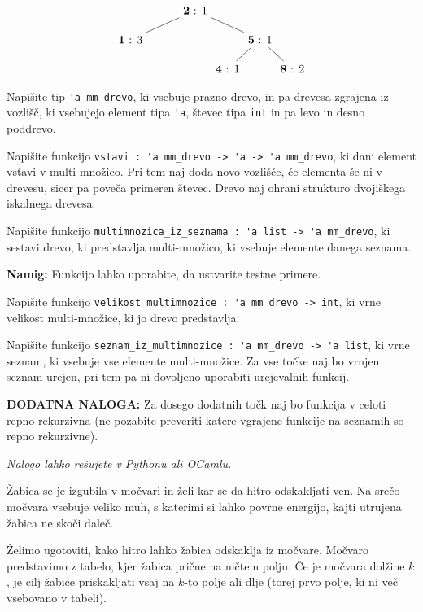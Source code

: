 \documentclass[arhiv]{../izpit}
\begin{document}
\[
  \begin{tikzpicture}[level distance=0.9cm,
    level 1/.style={sibling distance=4cm},
    level 2/.style={sibling distance=2cm},
    level 3/.style={sibling distance=2cm}
    ]
    \node {\textbf{2} : 1}
      child {node {\textbf{1} : 3}}
      child {node {\textbf{5} : 1}
        child {node {\textbf{4} : 1}}
        child {node {\textbf{8} : 2}}
      };
  \end{tikzpicture}
\]

\podnaloga
Napišite tip \verb|'a mm_drevo|, ki vsebuje prazno drevo, in pa drevesa zgrajena iz vozlišč, ki vsebujejo element tipa \verb|'a|, števec tipa \verb|int| in pa levo in desno poddrevo.

\podnaloga
Napišite funkcijo \verb|vstavi : 'a mm_drevo -> 'a -> 'a mm_drevo|, ki dani element vstavi v multi-množico. Pri tem naj doda novo vozlišče, če elementa še ni v drevesu, sicer pa poveča primeren števec. Drevo naj ohrani strukturo dvojiškega iskalnega drevesa.

\podnaloga
Napišite funkcijo \verb|multimnozica_iz_seznama : 'a list -> 'a mm_drevo|, ki sestavi drevo, ki predstavlja multi-množico, ki vsebuje elemente danega seznama.

\noindent\textbf{Namig:} Funkcijo lahko uporabite, da ustvarite testne primere. 

\podnaloga
Napišite funkcijo \verb|velikost_multimnozice : 'a mm_drevo -> int|, ki vrne velikost multi-množice, ki jo drevo predstavlja.

\podnaloga
Napišite funkcijo \verb|seznam_iz_multimnozice : 'a mm_drevo -> 'a list|, ki vrne seznam, ki vsebuje vse elemente multi-množice. Za vse točke naj bo vrnjen seznam urejen, pri tem pa ni dovoljeno uporabiti urejevalnih funkcij.

\noindent\textbf{DODATNA NALOGA:} Za dosego dodatnih točk naj bo funkcija v celoti repno rekurzivna (ne pozabite preveriti katere vgrajene funkcije na seznamih so repno rekurzivne).

\prostor

\naloga[]
\emph{Nalogo lahko rešujete v Pythonu ali OCamlu.}

\vspace{5mm}
Žabica se je izgubila v močvari in želi kar se da hitro odskakljati ven. Na srečo močvara vsebuje veliko muh, s katerimi si lahko povrne energijo, kajti utrujena žabica ne skoči daleč.

Želimo ugotoviti, kako hitro lahko žabica odskaklja iz močvare. Močvaro predstavimo z tabelo, kjer žabica prične na ničtem polju. Če je močvara dolžine $k$, je cilj žabice priskakljati vsaj na $k$-to polje ali dlje (torej prvo polje, ki ni več vsebovano v tabeli).
\end{document}
